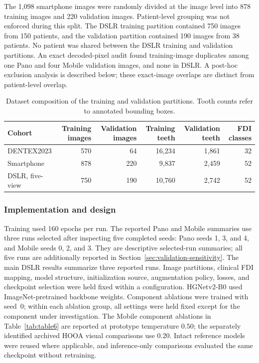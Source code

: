 \documentclass[a4paper,fleqn]{cas-dc}
\begin{document}
The 1,098 smartphone images were randomly divided at the image level into 878 training images and 220 validation images. Patient-level grouping was not enforced during this split. The DSLR training partition contained 750 images from 150 patients, and the validation partition contained 190 images from 38 patients. No patient was shared between the DSLR training and validation partitions. An exact decoded-pixel audit found training-image duplicates among one Pano and four Mobile validation images, and none in DSLR. A post-hoc exclusion analysis is described below; these exact-image overlaps are distinct from patient-level overlap.


\begin{table}[pos=t,width=\textwidth]
\caption{Dataset composition of the training and validation partitions. Tooth counts refer to annotated bounding boxes.}
\label{tab:table1}
\centering
\small
\begin{tabular*}{\textwidth}{@{\extracolsep{\fill}}lrrrrr@{}}
\toprule
Cohort & Training images & Validation images & Training teeth & Validation teeth & FDI classes \\
\midrule
DENTEX2023 & 570 & 64 & 16,234 & 1,861 & 32 \\
Smartphone & 878 & 220 & 9,837 & 2,459 & 52 \\
DSLR, five-view & 750 & 190 & 10,760 & 2,742 & 52 \\
\bottomrule
\end{tabular*}
\end{table}



\subsubsection{Implementation and design}
\label{sec:implementation}
Training used 160 epochs per run. The reported Pano and Mobile summaries use three runs selected after inspecting five completed seeds: Pano seeds 1, 3, and 4, and Mobile seeds 0, 2, and 3. They are descriptive selected-run summaries; all five runs are additionally reported in Section~\ref{sec:validation-sensitivity}. The main DSLR results summarize three reported runs. Image partitions, clinical FDI mapping, model structure, initialization source, augmentation policy, losses, and checkpoint selection were held fixed within a configuration. HGNetv2-B0 used ImageNet-pretrained backbone weights. Component ablations were trained with seed~0; within each ablation group, all settings were held fixed except for the component under investigation. The Mobile component ablations in Table~\ref{tab:table6} are reported at prototype temperature $0.50$; the separately identified archived HOOA visual comparisons use $0.20$. Intact reference models were reused where applicable, and inference-only comparisons evaluated the same checkpoint without retraining.
\end{document}
